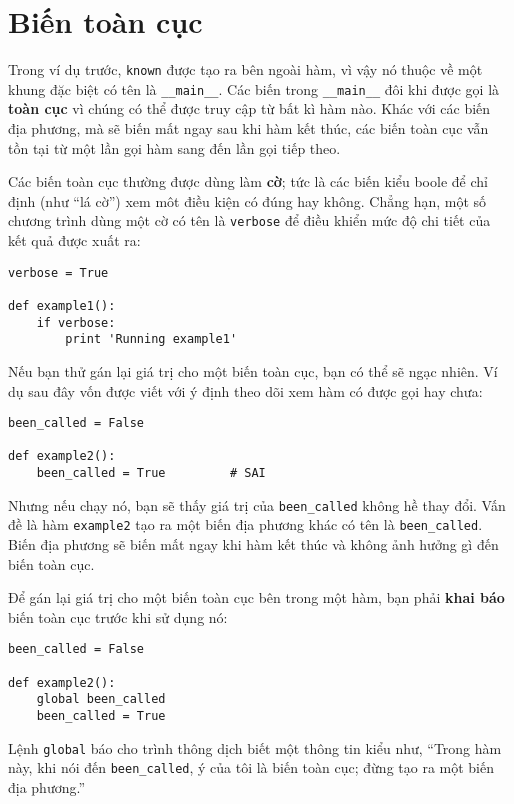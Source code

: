 \documentclass[11pt]{book}
\begin{document}
\section{Biến toàn cục}


Trong ví dụ trước, {\tt known} được tạo ra bên ngoài hàm,
vì vậy nó thuộc về một khung đặc biệt có tên là \verb"__main__".
Các biến trong \verb"__main__" đôi khi được gọi là {\bf toàn cục}
vì chúng có thể được truy cập từ bất kì hàm nào. Khác với các
biến địa phương, mà sẽ biến mất ngay sau khi hàm kết thúc, các biến
toàn cục vẫn tồn tại từ một lần gọi hàm sang đến lần gọi tiếp theo.


Các biến toàn cục thường được dùng làm {\bf cờ}; tức là 
các biến kiểu boole để chỉ định (như ``lá cờ'') xem môt điều kiện
có đúng hay không. Chẳng hạn, một số chương trình dùng một cờ
có tên là {\tt verbose} để điều khiển mức độ chi tiết của kết quả
được xuất ra:

\beforeverb
\begin{verbatim}
verbose = True

def example1():
    if verbose:
        print 'Running example1'
\end{verbatim}
\afterverb
%
Nếu bạn thử gán lại giá trị cho một biến toàn cục, bạn có thể sẽ
ngạc nhiên. Ví dụ sau đây vốn được viết với ý định theo dõi xem
hàm có được gọi hay chưa:



\beforeverb
\begin{verbatim}
been_called = False

def example2():
    been_called = True         # SAI
\end{verbatim}
\afterverb
%
Nhưng nếu chạy nó, bạn sẽ thấy giá trị của \verb"been_called"
không hề thay đổi. Vấn đề là hàm {\tt example2} tạo ra một biến 
địa phương khác có tên là \verb"been_called". Biến địa phương
sẽ biến mất ngay khi hàm kết thúc và không ảnh hưởng gì đến 
biến toàn cục.


Để gán lại giá trị cho một biến toàn cục bên trong một hàm,
bạn phải {\bf khai báo} biến toàn cục trước khi sử dụng nó:

\beforeverb
\begin{verbatim}
been_called = False

def example2():
    global been_called 
    been_called = True
\end{verbatim}
\afterverb
%
Lệnh {\tt global} báo cho trình thông dịch biết một thông tin
kiểu như, ``Trong hàm này, khi nói đến \verb"been_called", ý
của tôi là biến toàn cục; đừng tạo ra một biến địa phương.''
\end{document}
